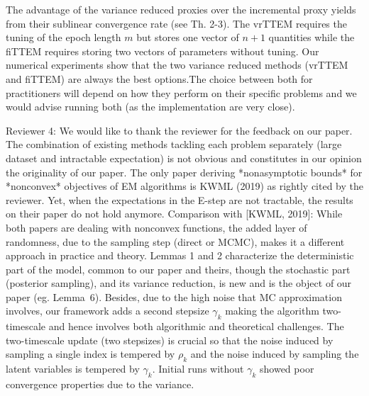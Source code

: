 \documentclass[anon,12pt]{alt2021} %
\begin{document}
The advantage of the variance reduced proxies over the incremental proxy yields from their sublinear convergence rate (see Th. 2-3). 
The vrTTEM requires the tuning of the epoch length $m$ but stores one vector of $n+1$ quantities while the fiTTEM requires storing two vectors of parameters without tuning.
Our numerical experiments show that the two variance reduced methods (vrTTEM and fiTTEM) are always the best options.The choice between both for practitioners will depend on how they perform on their specific problems and we would advise running both (as the implementation are very close).

Reviewer 4: We would like to thank the reviewer for the feedback on our paper. 
The combination of existing methods tackling each problem separately (large dataset and intractable expectation) is not obvious and constitutes in our opinion the originality of our paper.
The only paper deriving *nonasymptotic bounds* for *nonconvex* objectives of EM algorithms is KWML (2019) as rightly cited by the reviewer.
Yet, when the expectations in the E-step are not tractable, the results on their paper do not hold anymore. 
Comparison with [KWML, 2019]: While both papers are dealing with nonconvex functions, the added layer of randomness, due to the sampling step (direct or MCMC), makes it a different approach in practice and theory.
Lemmas 1 and 2 characterize the deterministic part of the model, common to our paper and theirs, though the stochastic part (posterior sampling), and its variance reduction, is new and is the object of our paper (eg. Lemma~6).
Besides, due to the high noise that MC approximation involves, our framework adds a second stepsize $\gamma_k$ making the algorithm two-timescale and hence involves both algorithmic and theoretical challenges. 
The two-timescale update (two stepsizes) is crucial so that the noise induced by sampling a single index is tempered by $\rho_k$ and the noise induced by sampling the latent variables is tempered by $\gamma_k$. 
Initial runs without $\gamma_k$ showed poor convergence properties due to the variance.
\end{document}
